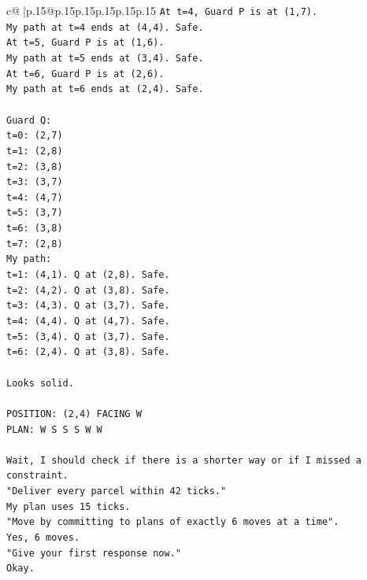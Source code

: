 \documentclass{article}
\begin{document}
{\begin{supertabular}{c@{$\;$}|p{.15\linewidth}@{}p{.15\linewidth}p{.15\linewidth}p{.15\linewidth}p{.15\linewidth}p{.15\linewidth}}
{{{\texttt{At t=4, Guard P is at (1,7).} \\
\texttt{My path at t=4 ends at (4,4). Safe.} \\
\texttt{At t=5, Guard P is at (1,6).} \\
\texttt{My path at t=5 ends at (3,4). Safe.} \\
\texttt{At t=6, Guard P is at (2,6).} \\
\texttt{My path at t=6 ends at (2,4). Safe.} \\
\\ 
\texttt{Guard Q:} \\
\texttt{t=0: (2,7)} \\
\texttt{t=1: (2,8)} \\
\texttt{t=2: (3,8)} \\
\texttt{t=3: (3,7)} \\
\texttt{t=4: (4,7)} \\
\texttt{t=5: (3,7)} \\
\texttt{t=6: (3,8)} \\
\texttt{t=7: (2,8)} \\
\texttt{My path:} \\
\texttt{t=1: (4,1). Q at (2,8). Safe.} \\
\texttt{t=2: (4,2). Q at (3,8). Safe.} \\
\texttt{t=3: (4,3). Q at (3,7). Safe.} \\
\texttt{t=4: (4,4). Q at (4,7). Safe.} \\
\texttt{t=5: (3,4). Q at (3,7). Safe.} \\
\texttt{t=6: (2,4). Q at (3,8). Safe.} \\
\\ 
\texttt{Looks solid.} \\
\\ 
\texttt{POSITION: (2,4) FACING W} \\
\texttt{PLAN: W S S S W W} \\
\\ 
\texttt{Wait, I should check if there is a shorter way or if I missed a constraint.} \\
\texttt{"Deliver every parcel within 42 ticks."} \\
\texttt{My plan uses 15 ticks.} \\
\texttt{"Move by committing to plans of exactly 6 moves at a time".} \\
\texttt{Yes, 6 moves.} \\
\texttt{"Give your first response now."} \\
\texttt{Okay.} \\
}}}
\end{supertabular}}
\end{document}
